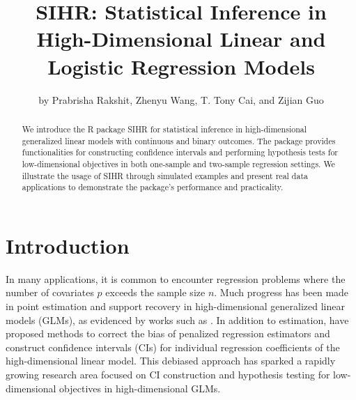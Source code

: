 \title{SIHR: Statistical Inference in High-Dimensional Linear and Logistic Regression Models}

\author{by Prabrisha Rakshit, Zhenyu Wang, T. Tony Cai, and Zijian Guo}

\maketitle
  
\begin{abstract}
We introduce the R package SIHR for statistical inference in high-dimensional generalized linear models with continuous and binary outcomes. The package provides functionalities for constructing confidence intervals and performing hypothesis tests for low-dimensional objectives in both one-sample and two-sample regression settings. We illustrate the usage of SIHR through simulated examples and present real data applications to demonstrate the package's performance and practicality.
\end{abstract}

\section{Introduction} \label{sec:intro}
In many applications, it is common to encounter regression problems where the number of covariates $p$ exceeds the sample size $n$. Much progress has been made in point estimation and support recovery in high-dimensional generalized linear models (GLMs), as evidenced by works such as \cite{buhlmann2011statistics, negahban2009unified, huang2012estimation, lasso, scad, mcp, slasso, sqlasso, srecov}. In addition to estimation,  \citet{van2014asymptotically, javanmard2014confidence, zhang2014confidence} have proposed methods to correct the bias of penalized regression estimators and construct confidence intervals  (CIs) for individual regression coefficients of the high-dimensional linear model. This debiased approach has sparked a rapidly growing research area focused on CI construction and hypothesis testing for low-dimensional objectives in high-dimensional GLMs.

